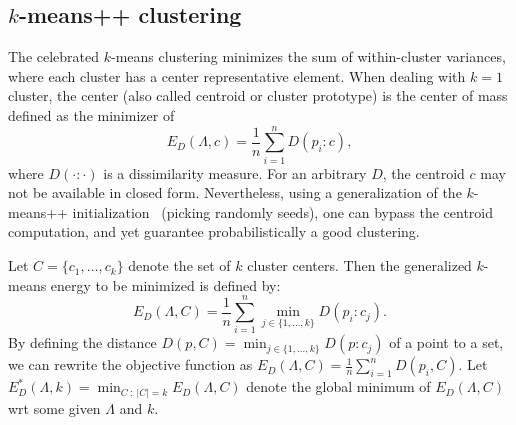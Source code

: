 \documentclass[graybox]{svmult}
\begin{document}
\subsection{$k$-means++ clustering}

The celebrated $k$-means clustering minimizes the sum of within-cluster variances,
where each cluster has a center representative element.
When dealing with $k=1$ cluster, the center (also called centroid or cluster prototype)
is the center of mass defined as the minimizer of
$$
E_D(\Lambda,c) = \frac{1}{n} \sum_{i=1}^n D(p_i:c),
$$
where $D(\cdot:\cdot)$ is a dissimilarity measure.
For an arbitrary $D$, the centroid $c$ may not be available in closed form. 
Nevertheless, using a generalization of the $k$-means++ initialization~\cite{kmeanspp-2007}
(picking randomly seeds), one can bypass the centroid computation,
and yet guarantee probabilistically a good clustering.

Let $C=\{c_1,\ldots, c_k\}$ denote the set of $k$ cluster centers.
Then the generalized $k$-means energy to be minimized is defined by:
$$
E_D(\Lambda,C) = \frac{1}{n}\sum_{i=1}^n \min_{j\in\{1,\ldots,k\}} D(p_i:c_j).
$$
By defining the distance $D(p,C)=\min_{j\in\{1,\ldots,k\}} D(p:c_j)$ of a point to a set,
we can rewrite the objective function as $E_D(\Lambda,C) = \frac{1}{n}\sum_{i=1}^n D(p_i,C)$.
Let $E_D^*(\Lambda,k)=\min_{C\ :\ |C|=k} E_D(\Lambda,C) $ denote the global minimum of
$E_D(\Lambda,C)$ wrt some given $\Lambda$ and $k$.
\end{document}
